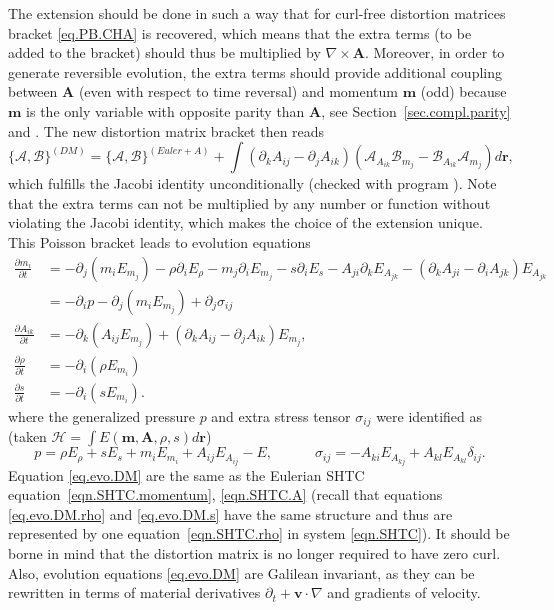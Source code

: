 \documentclass[twoside]{article}
\newcommand{\AAA}{{\boldsymbol{A}}}
\newcommand{\scH}{\mathscr{H}}
\newcommand{\rr}{{\boldsymbol{r}}}
\newcommand{\vv}{{\boldsymbol{v}}}
\newcommand{\mm}{{\boldsymbol{m}}}
\newcommand{\ted}{E} %
\newcommand{\AF}{\mathscr{A}}
\newcommand{\BF}{\mathscr{B}}
\newcommand{\pd}{\partial}
\begin{document}
The extension should be done in such a way that for curl-free distortion 
matrices bracket \eqref{eq.PB.CHA} is recovered, which means that the extra terms 
(to be added to the bracket) should thus be 
multiplied by $\nabla \times \AAA$. Moreover, in order to generate reversible 
evolution, the extra terms should provide 
additional coupling between $\AAA$ (even with respect to time reversal) and momentum $\mm$ (odd) because $\mm$ is the only 
variable 
with opposite parity than $\AAA$, see Section~\ref{sec.compl.parity} and 
\cite{PRE15}. The new distortion 
matrix bracket then reads
\begin{equation}\label{eq.PB.DM}
\{\AF,\BF\}^{(DM)} = \{\AF,\BF\}^{(Euler + A)} + \int \left(\pd_k A_{ij}-\pd_j 
A_{ik}\right)\left(\AF_{A_{ik}} 
\BF_{m_j}-\BF_{A_{ik}}\AF_{m_j}\right) d\rr,
\end{equation}
which fulfills the Jacobi identity unconditionally (checked with program 
\cite{kroeger2010}). Note that the extra terms can not be multiplied by any 
number or function without violating the Jacobi identity, which makes the 
choice of the extension unique. This Poisson bracket leads to evolution equations
\begin{subequations}\label{eq.evo.DM}
\begin{align}
\label{eq.evo.u.DM}\frac{\pd m_i}{\pd t} &= 
-\pd_j(m_i \ted_{m_j}) - \rho\pd_i \ted_\rho -m_j 
\pd_i \ted_{m_j} - s\pd_i \ted_s - A_{ji} \pd_k \ted_{A_{jk}} 
-(\pd_k A_{ji}-\pd_i A_{jk})\ted_{A_{jk}}\\[1mm]
 &= -\pd_i p-\pd_j(m_i \ted_{m_j}) +\pd_j 
 \sigma_{ij}\nonumber\\
\label{eq.evo.A}\frac{\pd A_{ik}}{\pd t} &= -\pd_k (A_{ij} 
\ted_{m_j})+(\pd_k A_{ij}-\pd_j A_{ik})\ted_{m_j},\\[1mm]
\frac{\pd \rho}{\pd t} &= -\pd_i (\rho \ted_{m_i})\label{eq.evo.DM.rho}\\[1mm]
\frac{\pd s}{\pd t} &= -\pd_i \left(s \ted_{m_i}\right).\label{eq.evo.DM.s}
\end{align}
\end{subequations}
where the generalized pressure $ p $ and extra stress tensor $ \sigma_{ij} $ 
were identified as 
(taken $ \scH = \int E(\mm,\AAA,\rho,s) d\rr$)
\begin{equation}
p = \rho \ted_\rho + s\ted_s + m_i \ted_{m_i} + A_{ij}\ted_{A_{ij}} - 
\ted,\qquad 
 \quad \sigma_{ij}= -A_{ki}\ted_{A_{kj}} + A_{kl}\ted_{A_{kl}} \delta_{ij}.
\end{equation}
Equation \eqref{eq.evo.DM} are the same as the Eulerian SHTC 
equation~\eqref{eqn.SHTC.momentum}, \eqref{eqn.SHTC.A} (recall that 
equations \eqref{eq.evo.DM.rho} and \eqref{eq.evo.DM.s} have the 
same structure and thus are represented by one equation~\eqref{eqn.SHTC.rho} in 
system \eqref{eqn.SHTC}). It should be 
borne in mind that the distortion matrix is no longer required to have zero 
curl. Also, evolution equations \eqref{eq.evo.DM} are Galilean invariant, as 
they can be 
rewritten in terms of material derivatives $\pd_t + \vv\cdot\nabla$ and 
gradients of velocity.
\end{document}
